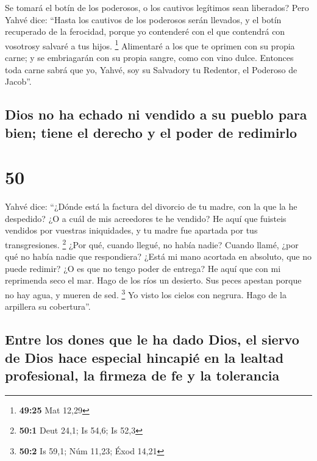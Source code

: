  Se tomará el botín de los poderosos, o los cautivos
legítimos sean liberados?  Pero Yahvé dice: ``Hasta los
cautivos de los poderosos serán llevados, y el botín recuperado de la
ferocidad, porque yo contenderé con el que contendrá con vosotrosy
salvaré a tus hijos. \footnote{\textbf{49:25} Mat 12,29} 
Alimentaré a los que te oprimen con su propia carne; y se embriagarán
con su propia sangre, como con vino dulce. Entonces toda carne sabrá que
yo, Yahvé, soy su Salvadory tu Redentor, el Poderoso de Jacob''.

\hypertarget{dios-no-ha-echado-ni-vendido-a-su-pueblo-para-bien-tiene-el-derecho-y-el-poder-de-redimirlo}{%
\subsection{Dios no ha echado ni vendido a su pueblo para bien; tiene el
derecho y el poder de
redimirlo}\label{dios-no-ha-echado-ni-vendido-a-su-pueblo-para-bien-tiene-el-derecho-y-el-poder-de-redimirlo}}

\hypertarget{section-49}{%
\section{50}\label{section-49}}

 Yahvé dice: ``¿Dónde está la factura del divorcio de tu
madre, con la que la he despedido? ¿O a cuál de mis acreedores te he
vendido? He aquí que fuisteis vendidos por vuestras iniquidades, y tu
madre fue apartada por tus transgresiones. \footnote{\textbf{50:1} Deut
  24,1; Is 54,6; Is 52,3}  ¿Por qué, cuando llegué, no
había nadie? Cuando llamé, ¿por qué no había nadie que respondiera?
¿Está mi mano acortada en absoluto, que no puede redimir? ¿O es que no
tengo poder de entrega? He aquí que con mi reprimenda seco el mar. Hago
de los ríos un desierto. Sus peces apestan porque no hay agua, y mueren
de sed. \footnote{\textbf{50:2} Is 59,1; Núm 11,23; Éxod 14,21}
 Yo visto los cielos con negrura. Hago de la arpillera su
cobertura''.

\hypertarget{entre-los-dones-que-le-ha-dado-dios-el-siervo-de-dios-hace-especial-hincapiuxe9-en-la-lealtad-profesional-la-firmeza-de-fe-y-la-tolerancia}{%
\subsection{Entre los dones que le ha dado Dios, el siervo de Dios hace
especial hincapié en la lealtad profesional, la firmeza de fe y la
tolerancia}\label{entre-los-dones-que-le-ha-dado-dios-el-siervo-de-dios-hace-especial-hincapiuxe9-en-la-lealtad-profesional-la-firmeza-de-fe-y-la-tolerancia}}

